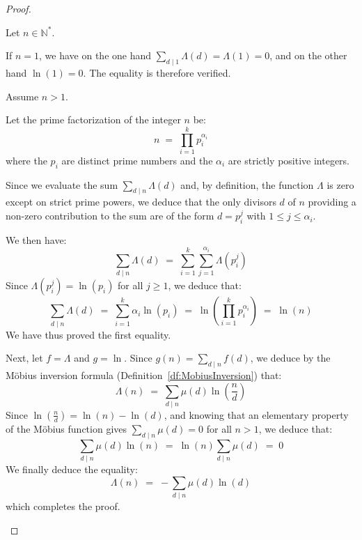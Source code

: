 \documentclass[Riemann_Hypothesis.tex]{subfiles}
\begin{document}
\begin{proof}
    \begin{part_proof}
        Let $n \in \mathbb{N}^*$. \par
        If $n=1$, we have on the one hand $\sum_{d \mid 1} \Lambda(d) = \Lambda(1) = 0$, and on the other hand $\ln(1) = 0$. The equality is therefore verified. \par
        Assume $n > 1$. \par
        Let the prime factorization of the integer $n$ be:
        \begin{equation*}
            n \;=\; \prod_{i=1}^{k} p_i^{\alpha_i}
        \end{equation*}
        where the $p_i$ are distinct prime numbers and the $\alpha_i$ are strictly positive integers. \medskip\par
        Since we evaluate the sum $\sum_{d \mid n} \Lambda(d)$ and, by definition, the function $\Lambda$ is zero except on strict prime powers, we deduce that the only divisors $d$ of $n$ providing a non-zero contribution to the sum are of the form $d = p_i^j$ with $1 \leq j \leq \alpha_i$. \par
        We then have:
        \begin{equation*}
            \sum_{d \mid n} \Lambda(d) \;=\; \sum_{i=1}^{k} \sum_{j=1}^{\alpha_i} \Lambda\left(p_i^j\right)
        \end{equation*}
        Since $\Lambda(p_i^j) = \ln(p_i)$ for all $j \geq 1$, we deduce that:
        \begin{equation*}
            \sum_{d \mid n} \Lambda(d) \;=\; \sum_{i=1}^{k} \alpha_i \ln(p_i) \;=\; \ln\left( \prod_{i=1}^{k} p_i^{\alpha_i} \right) \;=\; \ln(n)
        \end{equation*}
        We have thus proved the first equality. \par
        Next, let $f = \Lambda$ and $g = \ln$. Since $g(n) = \sum_{d \mid n} f(d)$, we deduce by the Möbius inversion formula (Definition~\ref{df:MobiusInversion}) that:
        \begin{equation*}
            \Lambda(n) \;=\; \sum_{d \mid n} \mu(d) \ln\left(\frac{n}{d}\right)
        \end{equation*}
        Since $\ln\left(\frac{n}{d}\right) = \ln(n) - \ln(d)$, and knowing that an elementary property of the Möbius function gives $\sum_{d \mid n} \mu(d) = 0$ for all $n > 1$, we deduce that:
        \begin{equation*}
            \sum_{d \mid n} \mu(d) \ln(n) \;=\; \ln(n) \sum_{d \mid n} \mu(d) \;=\; 0
        \end{equation*}
        We finally deduce the equality:
        \begin{equation*}
            \Lambda(n) \;=\; -\sum_{d \mid n} \mu(d) \ln(d)
        \end{equation*}
        which completes the proof.
    \end{part_proof}
\end{proof}
\end{document}
